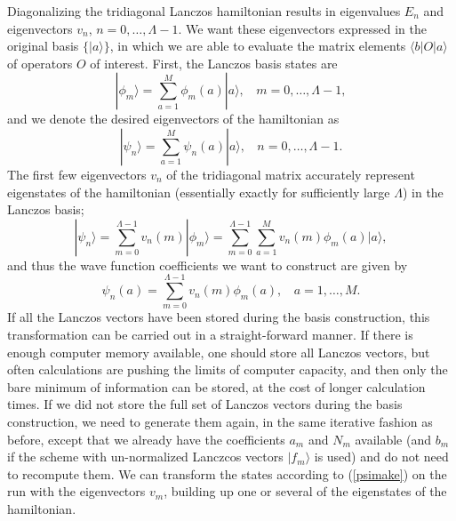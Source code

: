 \documentclass[draft,numberedheadings]{aipproc}
\begin{document}
Diagonalizing the tridiagonal Lanczos hamiltonian results in eigenvalues $E_n$ and eigenvectors $v_n$, $n=0,\ldots,\Lambda-1$. We want these eigenvectors 
expressed in the original basis $\{|a\rangle\}$, in which we are able to evaluate the matrix elements $\langle b|O|a\rangle$ of operators $O$ of interest. 
First, the Lanczos basis states are
\begin{equation}
|\phi_m\rangle = \sum_{a=1}^{M}\phi_m(a)|a\rangle,~~~~m=0,\ldots,\Lambda-1,
\label{lanczosphi}
\end{equation}
and we denote the desired eigenvectors of the hamiltonian as
\begin{equation}
|\psi_n\rangle = \sum_{a=1}^{M} \psi_n(a)|a\rangle,~~~~n=0,\ldots,\Lambda-1.
\label{psisuma}
\end{equation}
The first few eigenvectors $v_n$ of the tridiagonal matrix accurately represent eigenstates of the hamiltonian (essentially exactly for sufficiently 
large $\Lambda$) in the Lanczos basis;
\begin{equation}
|\psi_n\rangle = 
\sum_{m=0}^{\Lambda-1} v_n(m)|\phi_m\rangle = \sum_{m=0}^{\Lambda-1} \sum_{a=1}^{M} v_n(m)\phi_m(a)|a\rangle,
\end{equation}
and thus the wave function coefficients we want to construct are given by
\begin{equation}
\psi_n(a) = \sum_{m=0}^{\Lambda-1} v_n(m)\phi_m(a),~~~~a=1,\ldots,M.
\label{psimake}
\end{equation}
If all the Lanczos vectors have been stored during the basis construction, this transformation can be carried out in a straight-forward manner.
If there is enough computer memory available, one should store all Lanczos vectors, but often calculations are pushing the limits of computer capacity, 
and then only the bare minimum of information can be stored, at the cost of longer calculation times. If we did not store the full set of Lanczos 
vectors during the basis construction, we need to generate them again, in the same iterative fashion as before, except that we already have the coefficients
$a_m$ and $N_m$ available (and $b_m$ if the scheme with un-normalized Lanczcos vectors $|f_m\rangle$ is used) and do not need to recompute them. We can 
transform the states according to (\ref{psimake}) on the run with the eigenvectors $v_m$, building up one or several of the eigenstates of the hamiltonian.
\end{document}
